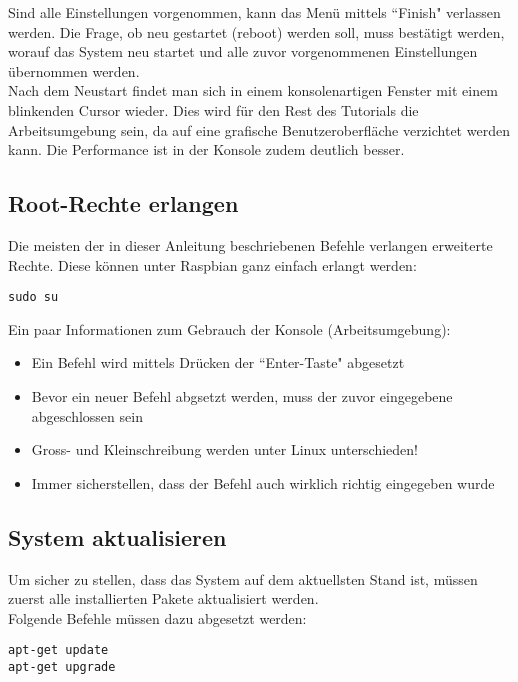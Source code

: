 Sind alle Einstellungen vorgenommen, kann das Menü mittels ``Finish" verlassen werden. Die Frage, ob neu gestartet (reboot) werden soll, muss bestätigt werden, worauf das System neu startet und alle zuvor vorgenommenen Einstellungen übernommen werden.
\\
Nach dem Neustart findet man sich in einem konsolenartigen Fenster mit einem blinkenden Cursor wieder. Dies wird für den Rest des Tutorials die Arbeitsumgebung sein, da auf eine grafische Benutzeroberfläche verzichtet werden kann. Die Performance ist in der Konsole zudem deutlich besser.


\subsection{Root-Rechte erlangen}
Die meisten der in dieser Anleitung beschriebenen Befehle verlangen erweiterte Rechte. Diese können unter Raspbian ganz einfach erlangt werden:

\begin{lstlisting}
sudo su
\end{lstlisting}

Ein paar Informationen zum Gebrauch der Konsole (Arbeitsumgebung): 

\begin{itemize}
\item Ein Befehl wird mittels Drücken der ``Enter-Taste" abgesetzt
\item Bevor ein neuer Befehl abgsetzt werden, muss der zuvor eingegebene abgeschlossen sein
\item Gross- und Kleinschreibung werden unter Linux unterschieden!
\item Immer sicherstellen, dass der Befehl auch wirklich richtig eingegeben wurde
\end{itemize}

\subsection{System aktualisieren}
Um sicher zu stellen, dass das System auf dem aktuellsten Stand ist, müssen zuerst alle installierten Pakete aktualisiert werden.
\\
Folgende Befehle müssen dazu abgesetzt werden:

\begin{lstlisting}
apt-get update
apt-get upgrade
\end{lstlisting}

